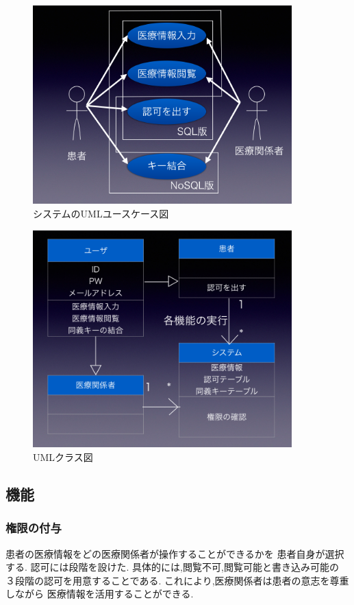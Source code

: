   \begin{figure}[htbp]
    \begin{center}
      \includegraphics[width=10cm, bb=0 0 1003 768]{./gazou/system_construct2.png}
    \end{center}
    \caption{システムのUMLユースケース図}
    \label{system_construct}
  \end{figure}

  \begin{figure}[htbp]
    \begin{center}
      \includegraphics[width=10cm, bb=0 0 916 760]{./gazou/class.png}
    \end{center}
    \caption{UMLクラス図}
    \label{class}
  \end{figure}

\subsection{機能}
  \subsubsection{権限の付与}
    患者の医療情報をどの医療関係者が操作することができるかを
    患者自身が選択する.
    認可には段階を設けた.
    具体的には,閲覧不可,閲覧可能と書き込み可能の
    ３段階の認可を用意することである.
    これにより,医療関係者は患者の意志を尊重しながら
    医療情報を活用することができる.



